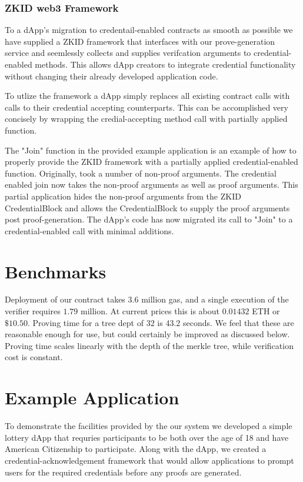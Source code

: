 \documentclass[11 pt]{extarticle}
\theoremstyle{remark}
\begin{document}
\subsubsection{ZKID web3 Framework}

To a dApp's migration to credentail-enabled contracts as smooth as possible we have supplied a ZKID framework that interfaces
with our prove-generation service and seemlessly collects and supplies verifcation arguments to credential-enabled methods. This 
allows dApp creators to integrate credential functionality without changing their already developed application code.

To utlize the framework a dApp simply replaces all existing contract calls with calls to their credential accepting counterparts. 
This can be accomplished very concisely by wrapping the credial-accepting method call with partially applied
function.

The "Join" function in the provided example application is an example of how to properly provide the ZKID framework with a partially applied credential-enabled function. Originally, took a number of non-proof arguments. 
The credential enabled join now takes the non-proof arguments as well as proof arguments. This partial application hides the non-proof arguments from the ZKID CredentialBlock and allows the CredentialBlock to 
supply the proof arguments post proof-generation. The dApp's code has now migrated its call to "Join" to a credential-enabled call with minimal additions.

\section{Benchmarks}

Deployment of our contract takes $3.6$ million gas, and a single execution of
the verifier requires $1.79$ million. At current prices this is about $0.01432$
ETH or $\$10.50$. Proving time for a tree dept of $32$ is 43.2 seconds. We feel
that these are reasonable enough for use, but could certainly be improved as
discussed below. Proving time scales linearly with the depth of the merkle tree,
while verification cost is constant.

\section{Example Application}

To demonstrate the facilities provided by the our system we developed a simple lottery dApp that requries participants to be
both over the age of 18 and have American Citizenship to participate. Along with the dApp, we created a credential-acknowledgement
framework that would allow applications to prompt users for the required credentials before any proofs are generated.
\end{document}
